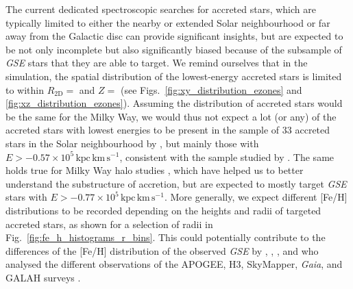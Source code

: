 \documentclass[fleqn,usenatbib]{mnras}
\begin{document}
The current dedicated spectroscopic searches for accreted stars, which are typically limited to either the nearby or extended Solar neighbourhood \citep[for example][]{Nissen2010, Buder2022} or far away from the Galactic disc \citep{Naidu2020} can provide significant insights, but are expected to be not only incomplete but also significantly biased because of the subsample of \textit{GSE} stars that they are able to target. We remind ourselves that in the simulation, the spatial distribution of the lowest-energy accreted stars is limited to within $R_\mathrm{2D} = $ and $Z = $ (see Figs.~\ref{fig:xy_distribution_ezones} and \ref{fig:xz_distribution_ezones}). Assuming the distribution of accreted stars would be the same for the Milky Way, we would thus not expect a lot (or any) of the accreted stars with lowest energies to be present in the sample of 33 accreted stars in the Solar neighbourhood by \citet{Nissen2010}, but mainly those with $E > -0.57\times10^5\,\mathrm{kpc\,km\,s^{-1}}$, consistent with the sample studied by \citet{Skuladottir2025}. The same holds true for Milky Way halo studies \citep{Naidu2020}, which have helped us to better understand the substructure of accretion, but are expected to mostly target \textit{GSE} stars with $E > -0.77\times10^{5}\,\mathrm{kpc\,km\,s^{-1}}$. More generally, we expect different [Fe/H] distributions to be recorded depending on the heights and radii of targeted accreted stars, as shown for a selection of radii in Fig.~\ref{fig:fe_h_histograms_r_bins}. This could potentially contribute to the differences of the [Fe/H] distribution of the observed \textit{GSE} by \citet{Das2020}, \citet{Naidu2020}, \citet{Feuillet2020, Feuillet2021}, and \cite{Buder2022} who analysed the different observations of the APOGEE, H3, SkyMapper, \textit{Gaia}, and GALAH surveys \citep[for a comparison of their reported {[Fe/H] distributions see Fig.~10 by}][]{Buder2022}.
\end{document}
